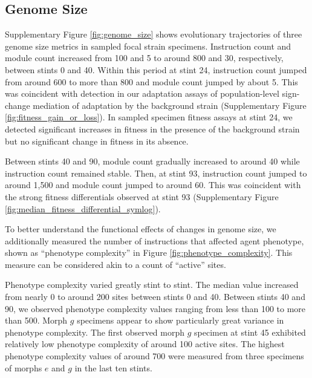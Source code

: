 \subsection{Genome Size}

Supplementary Figure \ref{fig:genome_size} shows evolutionary trajectories of three genome size metrics in sampled focal strain specimens.
Instruction count and module count increased from 100 and 5 to around 800 and 30, respectively, between stints 0 and 40.
Within this period at stint 24, instruction count jumped from around 600 to more than 800 and module count jumped by about 5.
This was coincident with detection in our adaptation assays of population-level sign-change mediation of adaptation by the background strain (Supplementary Figure \ref{fig:fitness_gain_or_loss}).
In sampled specimen fitness assays at stint 24, we detected significant increases in fitness in the presence of the background strain but no significant change in fitness in its absence.

Between stints 40 and 90, module count gradually increased to around 40 while instruction count remained stable.
Then, at stint 93, instruction count jumped to around 1,500 and module count jumped to around 60.
This was coincident with the strong fitness differentials observed at stint 93 (Supplementary Figure \ref{fig:median_fitness_differential_symlog}).

To better understand the functional effects of changes in genome size, we additionally measured the number of instructions that affected agent phenotype, shown as ``phenotype complexity'' in Figure \ref{fig:phenotype_complexity}.
This measure can be considered akin to a count of ``active'' sites.

Phenotype complexity varied greatly stint to stint.
The median value increased from nearly 0 to around 200 sites between stints 0 and 40.
Between stints 40 and 90, we observed phenotype complexity values ranging from less than 100 to more than 500.
Morph $g$ specimens appear to show particularly great variance in phenotype complexity.
The first observed morph $g$ specimen at stint 45 exhibited relatively low phenotype complexity of around 100 active sites.
The highest phenotype complexity values of around 700 were measured from three specimens of morphs $e$ and $g$ in the last ten stints.
